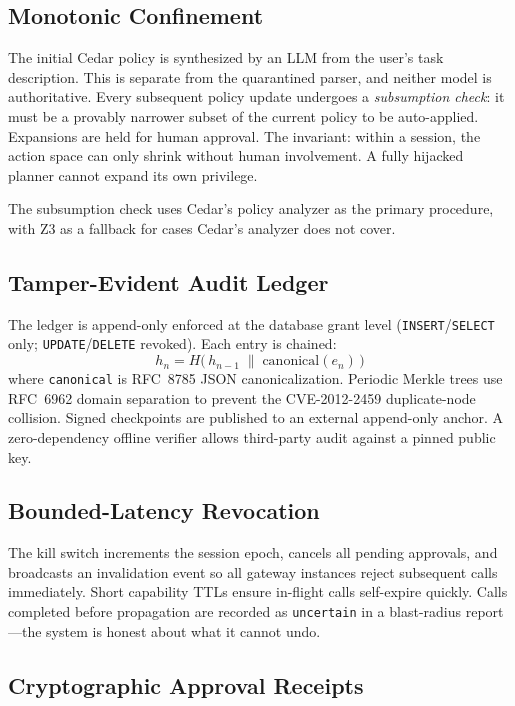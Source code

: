 \documentclass[10pt,conference]{IEEEtran}
\begin{document}
\subsection{Monotonic Confinement}

The initial Cedar policy is synthesized by an LLM from the user's task
description. This is separate from the quarantined parser, and neither model
is authoritative. Every
subsequent policy update undergoes a \emph{subsumption check}: it must be a
provably narrower subset of the current policy to be auto-applied. Expansions
are held for human approval. The invariant: within a session, the action space
can only shrink without human involvement. A fully hijacked planner cannot
expand its own privilege.

The subsumption check uses Cedar's policy analyzer as the primary procedure,
with Z3 as a fallback for cases Cedar's analyzer does not cover.

\subsection{Tamper-Evident Audit Ledger}

The ledger is append-only enforced at the database grant level
(\texttt{INSERT}/\texttt{SELECT} only; \texttt{UPDATE}/\texttt{DELETE}
revoked). Each entry is chained:
\begin{equation}
h_n = H\!\bigl(\, h_{n-1} \;\|\; \mathrm{canonical}(e_n) \,\bigr)
\end{equation}
where \texttt{canonical} is RFC~8785 JSON canonicalization. Periodic Merkle
trees use RFC~6962 domain separation to prevent the CVE-2012-2459
duplicate-node collision. Signed checkpoints are published to an external
append-only anchor. A zero-dependency offline verifier allows third-party audit against a pinned
public key.

\subsection{Bounded-Latency Revocation}

The kill switch increments the session epoch, cancels all pending approvals,
and broadcasts an invalidation event so all gateway instances reject subsequent
calls immediately. Short capability TTLs ensure in-flight calls self-expire
quickly. Calls completed before propagation are recorded as \texttt{uncertain}
in a blast-radius report---the system is honest about what it cannot undo.

\subsection{Cryptographic Approval Receipts}
\end{document}
